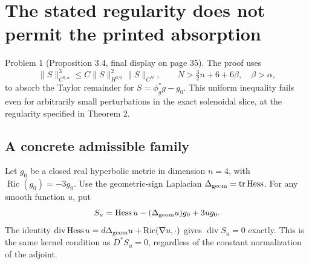 \documentclass[10pt]{article}
\begin{document}
\section*{The stated regularity does not permit the printed absorption}
Problem 1 (Proposition 3.4, final display on page 35).  The proof uses \[\|S\|_{C^{5,\alpha}}^3
 \le C\|S\|_{H^{3/2}}^2\|S\|_{C^N},
 \qquad N>\tfrac32 n+6+6\beta,\quad \beta>\alpha,
 \tag{A}\] to absorb the Taylor remainder for \(S=\phi_g^*g-g_0\). This uniform inequality fails even for arbitrarily small perturbations in the exact solenoidal slice, at the regularity specified in Theorem 2.\par
\subsection*{A concrete admissible family}
Let \(g_0\) be a closed real hyperbolic metric in dimension \(n=4\), with \(\operatorname{Ric}(g_0)=-3g_0\). Use the geometric-sign Laplacian \(\Delta_{\rm geom}=\operatorname{tr}\operatorname{Hess}\). For any smooth function \(u\), put \[S_u=\operatorname{Hess}u-(\Delta_{\rm geom}u)g_0+3u g_0.\] The identity \(\operatorname{div}\operatorname{Hess}u=d\Delta_{\rm geom}u+\operatorname{Ric}(\nabla u,\cdot)\) gives \(\operatorname{div}S_u=0\) exactly. This is the same kernel condition as \(D^*S_u=0\), regardless of the constant normalization of the adjoint.\par
\end{document}
